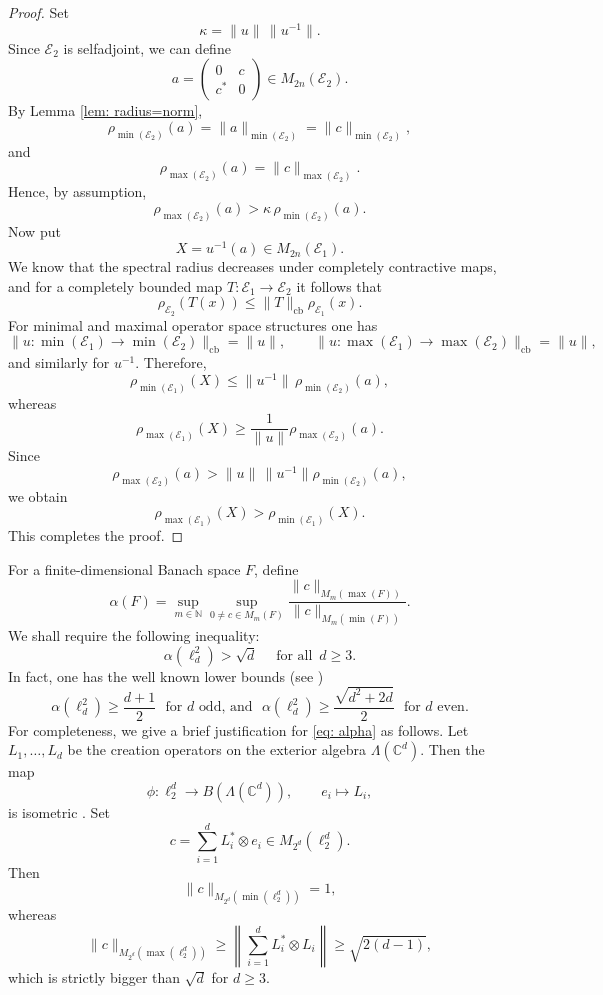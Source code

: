 \documentclass[12pt]{amsart}
\numberwithin{equation}{section}
\theoremstyle{definition}
\newcommand{\be}{\begin{equation}}
\newcommand{\ee}{\end{equation}}
\newcommand{\cE}{\mathcal{E}}
\begin{document}
\begin{proof}
Set
  \[
    \kappa=\|u\|\,\|u^{-1}\|.
  \]
Since $\cE_2$ is selfadjoint, we can define
  \[
    a=
    \begin{pmatrix}
    0 & c\\
    c^* & 0
    \end{pmatrix}
    \in M_{2n}(\cE_2).
  \]
By Lemma \ref{lem: radius=norm},
  \[
    \rho_{\min(\cE_2)}(a)
    =
    \|a\|_{\min(\cE_2)}
    =
    \|c\|_{\min(\cE_2)},
  \]
and
  \[
    \rho_{\max(\cE_2)}(a)
    =
    \|c\|_{\max(\cE_2)}.
  \]
Hence, by assumption,
  \[
    \rho_{\max(\cE_2)}(a)
    >
    \kappa\,\rho_{\min(\cE_2)}(a).
  \]
Now put
  \[
    X=u^{-1}(a)\in M_{2n}(\cE_1).
  \]
We know that the spectral radius decreases under completely contractive maps, and for a completely bounded map $T:\cE_1\to \cE_2$ it follows that
  \[
    \rho_{\cE_2}(T(x))
    \leq
    \|T\|_{\mathrm{cb}}\rho_{\cE_1}(x).
  \]
For minimal and maximal operator space structures one has
  \[
    \|u:\min(\cE_1)\to \min(\cE_2)\|_{\mathrm{cb}}=\|u\|,
    \qquad
    \|u:\max(\cE_1)\to \max(\cE_2)\|_{\mathrm{cb}}=\|u\|,
  \]
and similarly for $u^{-1}$. 
Therefore, 
  \[
    \rho_{\min(\cE_1)}(X)
    \leq
    \|u^{-1}\|\,\rho_{\min(\cE_2)}(a),
  \]
whereas
  \[
    \rho_{\max(\cE_1)}(X)
    \geq
    \frac{1}{\|u\|}\rho_{\max(\cE_2)}(a).
  \]
Since
  \[
    \rho_{\max(\cE_2)}(a)   
    >
    \|u\|\,\|u^{-1}\|\rho_{\min(\cE_2)}(a),
  \]
we obtain
  \[
    \rho_{\max(\cE_1)}(X)
    >
    \rho_{\min(\cE_1)}(X).
  \]
This completes the proof.
\end{proof}

For a finite-dimensional Banach space $F$, define
  \[
    \alpha(F)
    =
    \sup_{m\in\mathbb N}
    \sup_{0\neq c\in M_m(F)}
    \frac{
    \|c\|_{M_m(\max(F))}
    }{
    \|c\|_{M_m(\min(F))}
    }.
  \]
We shall require the following inequality: 
\be\label{eq: alpha}
\alpha(\ell^2_d) > \sqrt{d} \quad \textrm{ for all } \, d \geq 3.
\ee
In fact, one has the well known lower bounds (see \cite[Theorem 14.3]{Paulsen-book})
\[ 
\alpha(\ell^2_d) \geq \frac{d+1}{2} \,\, \textrm{ for } d \textrm{  odd, and }\,\,  \alpha(\ell^2_d) \geq \frac{\sqrt{d^2+2d}}{2} \,\, \textrm{ for } d \textrm{ even.}
\]
For completeness, we give a brief justification for \eqref{eq: alpha} as follows. Let $L_1,\dots,L_d$ be the creation operators on the exterior algebra
$\Lambda(\mathbb C^d)$. Then the map
\[
\phi:\ell_2^d\to B(\Lambda(\mathbb C^d)),
\qquad e_i\mapsto L_i,
\]
is isometric \cite[Theorem 9.3.1]{Pisier-book}. Set
\[
c=\sum_{i=1}^d L_i^*\otimes e_i
\in M_{2^d}(\ell_2^d).
\]
Then
\[
\|c\|_{M_{2^d}(\min(\ell_2^d))}=1,
\]
whereas
\[
\|c\|_{M_{2^d}(\max(\ell_2^d))}
\geq
\left\|\sum_{i=1}^d L_i^*\otimes L_i\right\|
\geq
\sqrt{2(d-1)}, 
\]
which is strictly bigger than $\sqrt{d}$ for $d \geq 3$. 
\end{document}
